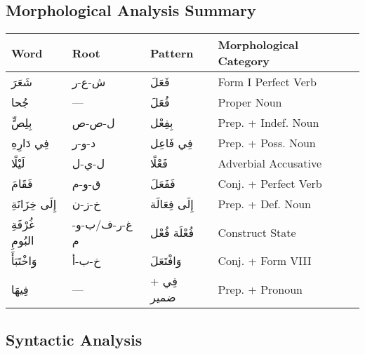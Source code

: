 \documentclass[letterpaper,12pt]{article}
\begin{document}
\subsection{Morphological Analysis Summary}

\begin{tcolorbox}[colback=white,colframe=accentcolor,title=\textbf{Morphological Breakdown},breakable]
\begin{tabular}{|p{3cm}|p{3cm}|p{3cm}|p{4cm}|}
\hline
\textbf{Word} & \textbf{Root} & \textbf{Pattern} & \textbf{Morphological Category} \\
\hline
\textarabic{شَعَرَ} & \textarabic{ش-ع-ر} & \textarabic{فَعَلَ} & Form I Perfect Verb \\
\hline
\textarabic{جُحا} & — & \textarabic{فُعَلَ} & Proper Noun \\
\hline
\textarabic{بِلِصٍّ} & \textarabic{ل-ص-ص} & \textarabic{بِفِعْل} & Prep. + Indef. Noun \\
\hline
\textarabic{فِي دَارِهِ} & \textarabic{د-و-ر} & \textarabic{فِي فَاعِل} & Prep. + Poss. Noun \\
\hline
\textarabic{لَيْلًا} & \textarabic{ل-ي-ل} & \textarabic{فَعْلًا} & Adverbial Accusative \\
\hline
\textarabic{فَقَامَ} & \textarabic{ق-و-م} & \textarabic{فَفَعَلَ} & Conj. + Perfect Verb \\
\hline
\textarabic{إِلَى خِزَانَةِ} & \textarabic{خ-ز-ن} & \textarabic{إِلَى فِعَالَة} & Prep. + Def. Noun \\
\hline
\textarabic{غُرْفَةِ البُومِ} & \textarabic{غ-ر-ف/ب-و-م} & \textarabic{فُعْلَة فُعْل} & Construct State \\
\hline
\textarabic{وَاخْتَبَأَ} & \textarabic{خ-ب-أ} & \textarabic{وَافْتَعَلَ} & Conj. + Form VIII \\
\hline
\textarabic{فِيهَا} & — & \textarabic{فِي + ضمير} & Prep. + Pronoun \\
\hline
\end{tabular}
\end{tcolorbox}

\subsection{Syntactic Analysis}
\end{document}
